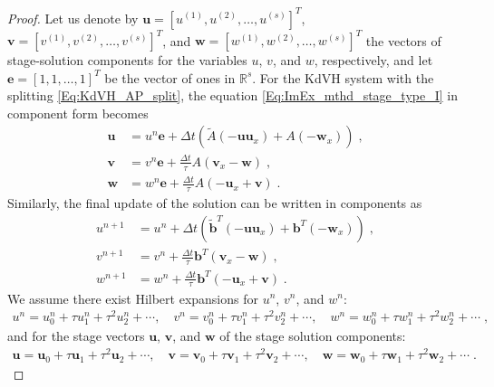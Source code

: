 \documentclass{article}
\newcommand{\tIAex}{\tilde{A}}
\newcommand{\tIbex}{\pmb{\tilde{b}}}
\newcommand{\tIAim}{A}
\newcommand{\tIbim}{\pmb{b}}
\begin{document}
\begin{proof}
Let us denote by $\pmb{u} = [u^{(1)}, u^{(2)}, \dots, u^{(s)}]^T$, $\pmb{v} = [v^{(1)}, v^{(2)}, \dots, v^{(s)}]^T$, and $\pmb{w} = [w^{(1)}, w^{(2)}, \dots, w^{(s)}]^T$ the vectors of stage-solution components for the variables $u$, $v$, and $w$, respectively, and let $\pmb{e} = [1, 1, \dots, 1]^T$ be the vector of ones in $\mathbb{R}^s$. For the KdVH system with the splitting \eqref{Eq:KdVH_AP_split}, the equation \eqref{Eq:ImEx_mthd_stage_type_I} in component form becomes
\begin{subequations}
\begin{align}
    \pmb{u} &= u^n \pmb{e} + \Delta t \left( \tIAex (-\pmb{u} \pmb{u}_x) + \tIAim(-\pmb{w}_x) \right) \;, \label{Eq:stage_u_type_I} \\
    \pmb{v} &= v^n \pmb{e} + \frac{\Delta t}{\tau}  \tIAim(\pmb{v}_x-\pmb{w}) \;, \label{Eq:stage_v_type_I} \\
    \pmb{w} &= w^n \pmb{e} + \frac{\Delta t}{\tau}  \tIAim(-\pmb{u}_x+\pmb{v}) \;. \label{Eq:stage_w_type_I}
\end{align}
\end{subequations}
Similarly, the final update of the solution can be written in components as
\begin{subequations}
\begin{align}
    u^{n+1} &= u^n  + \Delta t \left(\tIbex^T  (-\pmb{u} \pmb{u}_x) + \tIbim^T  (-\pmb{w}_x)  \right) \;, \label{Eq:sol_u_type_I} \\
    v^{n+1} &= v^n  + \frac{\Delta t}{\tau}  \tIbim^T  (\pmb{v}_x-\pmb{w}) \;, \label{Eq:sol_v_type_I} \\
    w^{n+1} &= w^n + \frac{\Delta t}{\tau}  \tIbim^T  (-\pmb{u}_x+\pmb{v})  \;. \label{Eq:sol_w_type_I}
\end{align}
\end{subequations}
We assume there exist Hilbert expansions for $u^n$, $v^n$, and $w^n$:
\begin{align} \label{hilbert}
u^n = u^n_0 + \tau u^n_1 + \tau^2 u^n_2 + \cdots, \quad v^n  = v^n_0 + \tau v^n_1 + \tau^2 v^n_2 + \cdots, \quad w^n = w^n_0 + \tau w^n_1 + \tau^2 w^n_2 + \cdots \;,
\end{align}
and for the stage vectors $\pmb{u}$, $\pmb{v}$, and $\pmb{w}$ of the stage solution components:
\begin{align*}
\pmb{u} = \pmb{u}_0 + \tau \pmb{u}_1 + \tau^2 \pmb{u}_2 + \cdots, \quad \pmb{v}  = \pmb{v}_0 + \tau \pmb{v}_1 + \tau^2 \pmb{v}_2 + \cdots, \quad \pmb{w} = \pmb{w}_0 + \tau \pmb{w}_1 + \tau^2 \pmb{w}_2 + \cdots \;.
\end{align*}


\end{proof}
\end{document}
